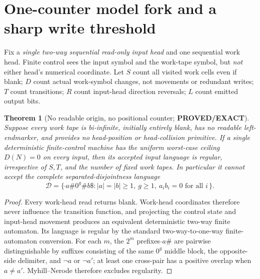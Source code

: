 \documentclass[11pt]{article}
\newtheorem{theorem}{Theorem}
\begin{document}
\section{One-counter model fork and a sharp write threshold}
Fix a \emph{single two-way sequential read-only input head} and one sequential work head. Finite control sees the input symbol and the work-tape symbol, but \emph{not} either head's numerical coordinate. Let $S$ count all visited work cells even if blank; $D$ count actual work-symbol changes, not movements or redundant writes; $T$ count transitions; $R$ count input-head direction reversals; $L$ count emitted output bits.

\begin{theorem}[No readable origin, no positional counter; \textbf{PROVED/EXACT}]
Suppose every work tape is bi-infinite, initially entirely blank, has no readable left-endmarker, and provides no head-position or head-collision primitive. If a single deterministic finite-control machine has the uniform worst-case ceiling $D(N)=0$ on every input, then its accepted input language is regular, irrespective of $S,T$, and the number of fixed work tapes. In particular it cannot accept the complete separated-disjointness language
\[
\mathcal{D}=\{\,\hat{}a\#0^g\#b\$:|a|=|b|\ge1,\ g\ge1,
\ a_i b_i=0\text{ for all }i\,\}.                       \tag{5}
\]
\end{theorem}
\begin{proof}Every work-head read returns blank. Work-head coordinates therefore never influence the transition function, and projecting the control state and input-head movement produces an equivalent deterministic two-way finite automaton. Its language is regular by the standard two-way-to-one-way finite-automaton conversion. For each $m$, the $2^m$ prefixes $\hat{}a\#$ are pairwise distinguishable by suffixes consisting of the same $0^g$ middle block, the opposite-side delimiter, and $\neg a$ or $\neg a'$; at least one cross-pair has a positive overlap when $a\ne a'$. Myhill--Nerode therefore excludes regularity.\end{proof}
\end{document}
